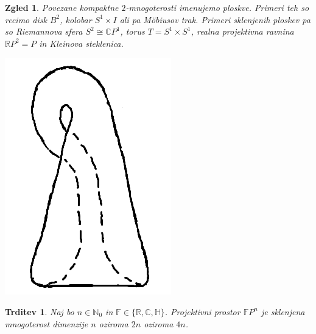 \documentclass[10pt, a4paper]{article}
\newtheorem{trditev}[izr]{Trditev}
\newtheorem{zgled}[izr]{Zgled}
\newcommand{\N}{\mathbb {N}}
\newcommand{\R}{\mathbb {R}}
\newcommand{\C}{\mathbb {C}}
\newcommand{\Ha}{\mathbb {H}}
\newcommand{\F}{\mathbb {F}}
\begin{document}
\begin{zgled}
    Povezane kompaktne $2$-mnogoterosti imenujemo ploskve.
    Primeri teh so recimo disk $B^2$, kolobar $S^1 \times I$ ali pa Möbiusov trak.  
    Primeri sklenjenih ploskev pa so Riemannova sfera $S^2 \cong \C P^1$, torus $T = S^1 \times S^1$,
    realna projektivna ravnina $\R P^2 = P$ in Kleinova steklenica.
    \begin{center}
      \includegraphics[scale=0.6]{zgled10.png}
    \end{center}
\end{zgled}

\begin{trditev}
  Naj bo $n \in \N_0$ in $\F \in \{\R, \C, \Ha\}$.
  Projektivni prostor $\F P^n$ je sklenjena mnogoterost dimenzije $n$ oziroma $2n$ oziroma $4n$.
\end{trditev}
\end{document}
